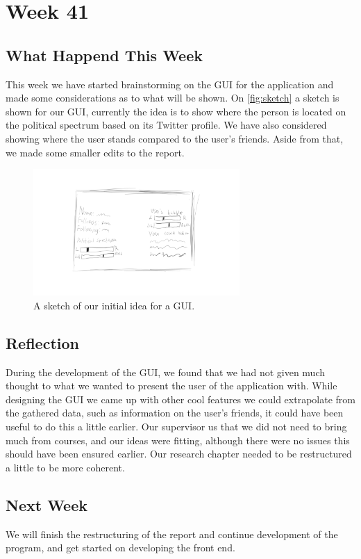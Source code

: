 \section*{Week 41} 
\subsection*{What Happend This Week}
This week we have started brainstorming on the \ac{GUI} for the application and
made some considerations as to what will be shown. On \autoref{fig:sketch} a
sketch is shown for our \ac{GUI}, currently the idea is to show where the person is
located on the political spectrum based on its Twitter profile. We have also
considered showing where the user stands compared to the user's friends. Aside
from that, we made some smaller edits to the report.

\begin{figure}[H] 
	\centering 
	\includegraphics[width = 0.7\textwidth]{figures/guisketch2.png}
	\caption{A sketch of our initial idea for a \ac{GUI}.}
	\label{fig:sketch}
\end{figure}

\subsection*{Reflection} 
During the development of the \ac{GUI}, we found that
we had not given much thought to what we wanted to present the user of the
application with. While designing the \ac{GUI} we came up with other cool
features we could extrapolate from the gathered data, such as information on the
user's friends, it could have been useful to do this a little earlier. Our
supervisor us that we did not need to bring much from courses, and our ideas
were fitting, although there were no issues this should have been ensured
earlier. Our research chapter needed to be restructured a little to be more
coherent.


\subsection*{Next Week}
We will finish the restructuring of the report and continue development of the
program, and get started on developing the front end.



% 
% 
% 
